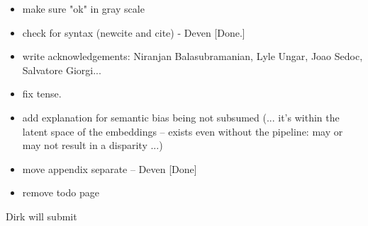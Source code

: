 \begin{itemize}
    \item make sure "ok" in gray scale
    
    \item check for syntax (newcite and cite) - Deven [Done.]
    
    \item write acknowledgements: Niranjan Balasubramanian, Lyle Ungar, Joao Sedoc, Salvatore Giorgi... 
    
    \item fix tense. 
    
    \item add explanation for semantic bias being not subsumed  (... it's within the latent space of the embeddings -- exists even without the pipeline: may or may not result in a disparity ...)
    
    \item move appendix separate -- Deven [Done]
    
    \item remove todo page
    
\end{itemize}

Dirk will submit 